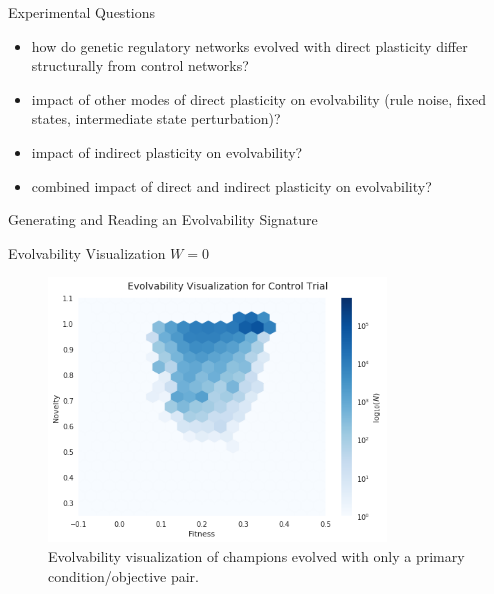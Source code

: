 \begin{frame}{Experimental Questions}
\begin{itemize}
\item how do genetic regulatory networks evolved with direct plasticity differ structurally from control networks? \cite{Reisinger2007AcquiringRepresentations}
\item impact of other modes of direct plasticity on evolvability (rule noise, fixed states, intermediate state perturbation)?
\item impact of indirect plasticity on evolvability?   
\item combined impact of direct and indirect plasticity on evolvability?   
\end{itemize}
\end{frame}


\begin{frame}{Generating and Reading an Evolvability Signature}
  
\end{frame}

\begin{frame}{Evolvability Visualization $W=0$} 
\begin{figure}
    \centering
    \includegraphics[width=0.8\textwidth]{img/ev_w0}
 	\captionsetup{singlelinecheck=off,justification=raggedright}
  	\caption{Evolvability visualization of champions evolved with only a primary condition/objective pair.}
    \label{fig:ev_w0}
\end{figure}
\end{frame}


